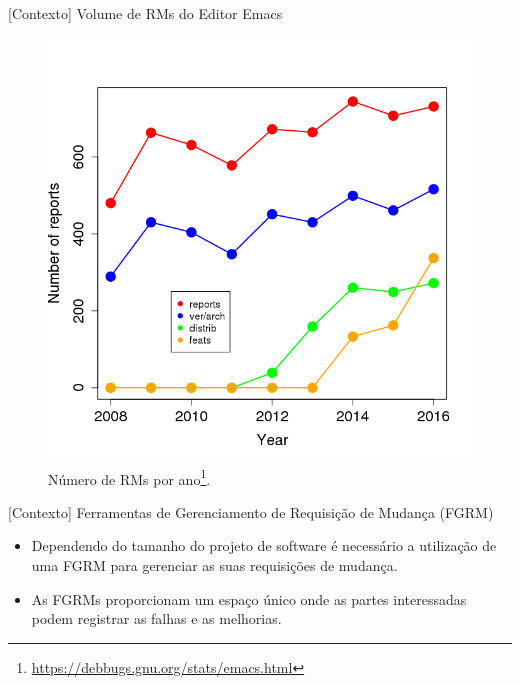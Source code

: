 \documentclass[t,14pt,mathserif]{beamer}
\begin{document}
\begin{frame}{[Contexto] Volume de RMs do Editor Emacs}
    \begin{figure}[htpb]
        \centering
        \includegraphics[width=.42\linewidth]{../img/sample.png}
\caption{Número de RMs por ano\footnote{\url{https://debbugs.gnu.org/stats/emacs.html}}.}
\label{fig:emacs_num_rm_por_ano}
    \end{figure}
\end{frame}

\begin{frame}{[Contexto] Ferramentas de Gerenciamento de Requisição de Mudança
        (FGRM)}
	\begin{itemize}
        \item Dependendo do tamanho do projeto de software é necessário a
              utilização de uma \alert{FGRM} para gerenciar as suas requisições de
              mudança.
        \item As \alert{FGRMs} proporcionam um espaço único onde as partes
              interessadas podem registrar as falhas e as
              melhorias.
	\end{itemize}
\end{frame}
\end{document}
